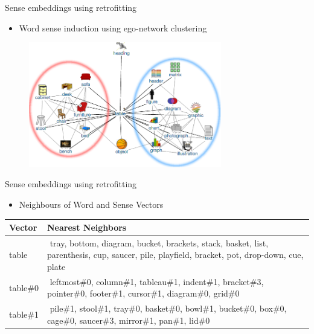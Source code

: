 \documentclass[usenames,dvipsnames]{beamer}
\begin{document}
\begin{frame}{Sense embeddings using retrofitting}

\begin{itemize}
\item Word sense induction using  ego-network clustering
\end{itemize} 
	
\centering
\begin{figure}
\includegraphics[width=0.75\textwidth]{table}
\end{figure}

\end{frame}


\begin{frame}{Sense embeddings using retrofitting}

\begin{itemize}
	\item Neighbours of Word and Sense Vectors
\end{itemize}


%

\begin{tabular}{l|p{9cm}}
\bf Vector & \bf {Nearest Neighbors} \\ \toprule
 table & $ $ \alert{tray}, \textcolor{Cerulean}{bottom}, \textcolor{Cerulean}{diagram}, \alert{bucket}, \textcolor{Cerulean}{brackets}, \textcolor{Cerulean}{stack}, \alert{basket}, \textcolor{Cerulean}{list}, \textcolor{Cerulean}{parenthesis}, \alert{cup}, \alert{saucer}, \alert{pile}, \alert{playfield}, \textcolor{Cerulean}{bracket}, \alert{pot}, \textcolor{Cerulean}{drop-down}, \alert{cue}, \alert{plate} \\ \midrule
 \pause
  \textcolor{Cerulean}{table\#0} & $ $ \textcolor{Cerulean}{leftmost\#0},  \textcolor{Cerulean}{column\#1},  \textcolor{Cerulean}{tableau\#1},  \textcolor{Cerulean}{indent\#1},  \textcolor{Cerulean}{bracket\#3},  \textcolor{Cerulean}{pointer\#0},  \textcolor{Cerulean}{footer\#1}, \textcolor{Cerulean}{cursor\#1}, \textcolor{Cerulean}{diagram\#0}, \textcolor{Cerulean}{grid\#0} \\ \midrule
   \alert{table\#1} & $ $ \alert{pile\#1,  stool\#1,  tray\#0,  basket\#0,  bowl\#1,  bucket\#0,  box\#0,  cage\#0,  saucer\#3,      mirror\#1,  pan\#1,  lid\#0}  \\ 
\end{tabular}
	

\end{frame}
\end{document}

